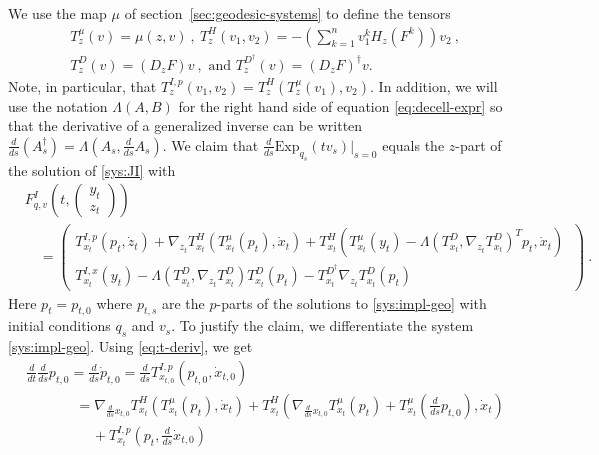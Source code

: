 \documentclass[final]{svjour3}
\newcommand{\df}[2]{\tfrac{d}{d#2} #1}
\newcommand{\sdf}[2]{\scriptscriptstyle\frac{d}{d#2} #1}
\newcommand{\Exp}{\mathrm{Exp}}
\newcommand{\Hess}{H}
\begin{document}
    We use the map $\mu$ of section~\ref{sec:geodesic-systems}
    to define the tensors
    \begin{align*}
        &T_z^\mu(v)=\mu(z,v)\ ,\ 
        T_z^H(v_1,v_2)=-\left(\sum_{k=1}^nv_1^k\Hess_{z}(F^k)\right)v_2 \ , \\
        &T_z^D(v)=\left(D_zF\right)v\ ,\mbox{ and }
        T_z^{D^\dagger}(v)=\left(D_zF\right)^\dagger v .
    \end{align*}
    Note, in particular, that $T_z^{I,p}(v_1,v_2)=T_z^H(T_z^\mu(v_1),v_2)$.
    In addition, we will use the
    notation $\Lambda(A,B)$ for the right hand side of equation
    \eqref{eq:decell-expr}
    so that the derivative of a generalized inverse can be written
    $\df{(A_s^\dagger)}{s}=\Lambda(A_s,\df{A_s}{s})$.
    We claim that $\df{\Exp_{q_s}(tv_s)}{s}|_{s=0}$ equals the $z$-part of the solution of
    \eqref{sys:JI} with
    \begin{equation}
        \begin{split}
            &F_{q,v}^I\left(t,
            \begin{pmatrix}
                y_t\\
                z_t
            \end{pmatrix}
            \right)
            \\
            &\quad
            =
            {\scriptstyle
            \begin{pmatrix}
                T_{x_{t}}^{I,p}(p_t,\dot{z}_t)
                +
                \nabla_{z_t}T_{x_t}^H(T_{x_t}^\mu(p_t),\dot{x}_t)
                +
                T_{x_{t}}^H(
                T^\mu_{x_{t}}(y_t)
                -\Lambda(T_{x_{t}}^D,\nabla_{z_t}T_{x_t}^D)^Tp_t
                ,
                \dot{x}_t)
                \ \\
                T_{x_{t}}^{I,x}(y_t)
                -\Lambda(T_{x_{t}}^D,\nabla_{z_t}T_{x_t}^D)T_{x_{t}}^D(p_t)
                -T_{x_{t}}^{D^\dagger}\nabla_{z_t}T_{x_t}^D(p_t)
            \end{pmatrix}
            }
            \ .
        \end{split}
        \label{eq:FI}
    \end{equation}
    Here $p_t=p_{t,0}$ where $p_{t,s}$ are the $p$-parts of the solutions to \eqref{sys:impl-geo} 
    with initial conditions $q_s$ and $v_s$. To justify the claim, we differentiate the system \eqref{sys:impl-geo}. 
    Using \eqref{eq:t-deriv}, we get
    \begin{align*}
        &\df{\df{p_{t,0}}{s}}{t} 
        =
        \df{\dot{p}_{t,0}}{s}
        =
        \df{T_{x_{t,0}}^{I,p}}{s}(p_{t,0},\dot{x}_{t,0})
        \\
        &\qquad\quad\enspace
        = 
        \nabla_{\sdf{x_{t,0}}{s}}T_{x_t}^H(T_{x_t}^\mu(p_t),\dot{x}_t)
        +
        T_{x_{t}}^H(\nabla_{\sdf{x_{t,0}}{s}}T_{x_t}^\mu(p_{t})
        +
        T_{x_t}^\mu(\df{p_{t,0}}{s}),\dot{x}_{t})
        \\
        &\qquad\qquad\enspace\,
        +
        T_{x_{t}}^{I,p}(p_{t},\df{\dot{x}_{t,0}}{s})
    \end{align*}
\end{document}
